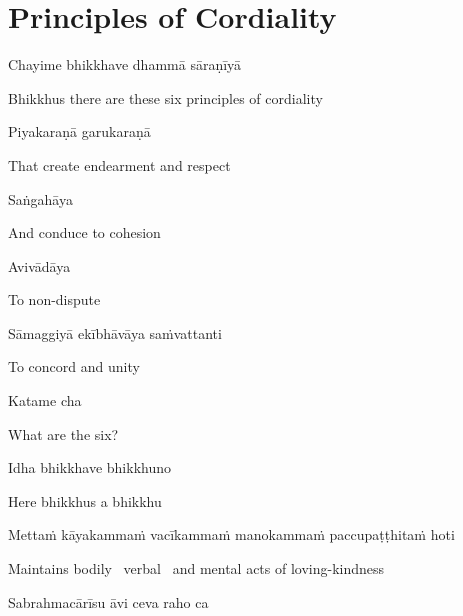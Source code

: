 \section{Principles of Cordiality}
\label{principles-of-cordiality}

\begin{leader}
\end{leader}

Chayime bhikkhave dhammā sāraṇīyā

\begin{english}
  Bhikkhus there are these six principles of cordiality
\end{english}

Piyakaraṇā garukaraṇā

\begin{english}
  That create endearment and respect
\end{english}

Saṅgahāya

\begin{english}
  And conduce to cohesion
\end{english}

Avivādāya

\begin{english}
  To non-dispute
\end{english}

Sāmaggiyā ekībhāvāya saṁvattanti

\begin{english}
  To concord and unity
\end{english}

Katame cha

\begin{english}
  What are the six?
\end{english}

Idha bhikkhave bhikkhuno

\begin{english}
  Here bhikkhus a bhikkhu
\end{english}

Mettaṁ kāyakammaṁ vacīkammaṁ manokammaṁ paccupaṭṭhitaṁ hoti

\begin{english}
  Maintains bodily \breathmark\ verbal \breathmark\ and mental acts of loving-kindness
\end{english}

Sabrahmacārīsu āvi ceva raho ca

